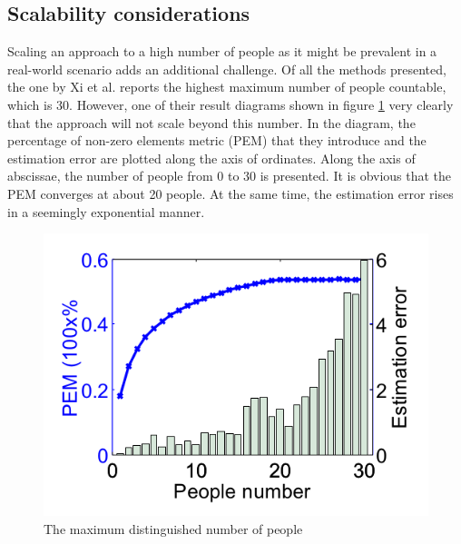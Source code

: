 \documentclass[conference]{IEEEtran}
\begin{document}
\subsection{Scalability considerations}
Scaling an approach to a high number of people as it might be prevalent in a real-world scenario adds an additional challenge. Of all the methods presented, the one by Xi et al. \cite{Xi} reports the highest maximum number of people countable, which is 30. However, one of their result diagrams shown in figure \ref{figFrogeyeConvergence} very clearly that the approach will not scale beyond this number. In the diagram, the percentage of non-zero elements metric (PEM) that they introduce and the estimation error are plotted along the axis of ordinates. Along the axis of abscissae, the number of people from 0 to 30 is presented. It is obvious that the PEM converges at about 20 people. At the same time, the estimation error rises in a seemingly exponential manner.
\begin{figure}[htbp]
\centerline{\includegraphics[scale=0.8]{figFrogeyeConvergence.PNG}}
\caption{The maximum distinguished number of people \cite{Xi}}
\label{figFrogeyeConvergence}
\end{figure}
\end{document}
